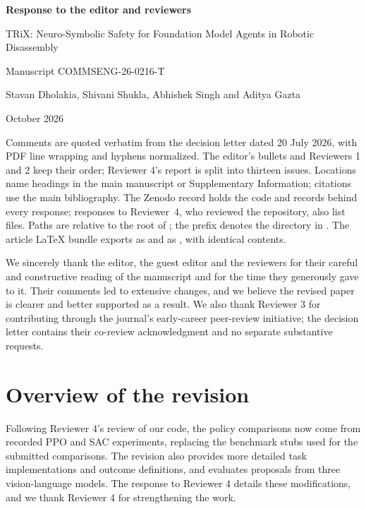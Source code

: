 \documentclass[11pt,letterpaper]{article}
\begin{document}
\raggedright
\thispagestyle{plain}
{\fontsize{16}{20}\selectfont\bfseries Response to the editor and reviewers\par}
\medskip
{\bfseries\raggedright TRiX: Neuro-Symbolic Safety for Foundation Model Agents in Robotic Disassembly\par}
Manuscript COMMSENG-26-0216-T\par
Stavan Dholakia, Shivani Shukla, Abhishek Singh and Aditya Gazta\par
October 2026

\medskip
Comments are quoted verbatim from the decision letter dated 20 July 2026, with
PDF line wrapping and hyphens normalized. The editor's bullets and Reviewers 1
and 2 keep their order; Reviewer 4's report is split into thirteen issues.
Locations name headings in the main manuscript or Supplementary Information;
citations use the main bibliography. The Zenodo record holds the code and
records behind every response; responses to Reviewer~4, who reviewed the
repository, also list files. Paths are relative to the root of
; the prefix  denotes the
 directory in
. The article LaTeX bundle exports
 as  and
 as , with
identical contents.

We sincerely thank the editor, the guest editor and the reviewers for their
careful and constructive reading of the manuscript and for the time they
generously gave to it. Their comments led to extensive changes, and we
believe the revised paper is clearer and better supported as a result. We
also thank Reviewer 3 for contributing through the journal's early-career
peer-review initiative; the decision letter contains their co-review
acknowledgment and no separate substantive requests.

\section*{Overview of the revision}

Following Reviewer 4's review of our code, the policy comparisons now come from recorded PPO and SAC experiments, replacing the benchmark stubs used for the submitted comparisons. The revision also provides more detailed task implementations and outcome definitions, and evaluates proposals from three vision-language models. The response to Reviewer 4 details these modifications, and we thank Reviewer 4 for strengthening the work.
\end{document}

